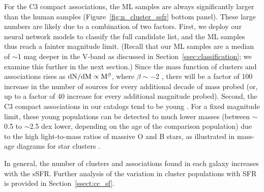 \documentclass[linenumbers]{aastex63}
\begin{document}
For the C3 compact associations, the ML samples are always significantly larger than the human samples (Figure~\ref{fig:n_cluster_ssfr} bottom panel). 
These large numbers are likely due to a combination of two factors.
First, we deploy our neural network models to classify the full candidate list, and the ML samples thus reach a fainter magnitude limit.  (Recall that our ML samples are a median of $\sim$1 mag deeper in the V-band as discussed in Section~\ref{ssec:classification}; we examine this further in the next section.)  Since the mass function of clusters and associations rises as $\rm{dN/dM} \propto M{^\beta}$, where $\beta\sim-2$ \citep[and references therein]{krumholz_star_2019}, there will be a factor of 100 increase in the number of sources for every additional decade of mass probed (or, up to a factor of 40 increase for every additional magnitude probed).  Second, the C3 compact associations in our catalogs tend to be young \citep[$\lesssim$10 Myr, e.g.,][see also Sec~\ref{ssect:cc_regions}]{lee_phangs-hst_2022}.  For a fixed magnitude limit, these young populations can be detected to much lower masses (between $\sim$0.5 to $\sim$2.5 dex lower, depending on the age of the comparison population) due to the high light-to-mass ratios of massive O and B stars, as illustrated in mass-age diagrams for star clusters \citep[e.g.,][Figure 13]{cook_star_2019}.  



In general, the number of clusters and associations found in each galaxy increases with the sSFR.  Further analysis of the variation in cluster populations with SFR is provided in Section~\ref{ssect:cc_sf}.
\end{document}
